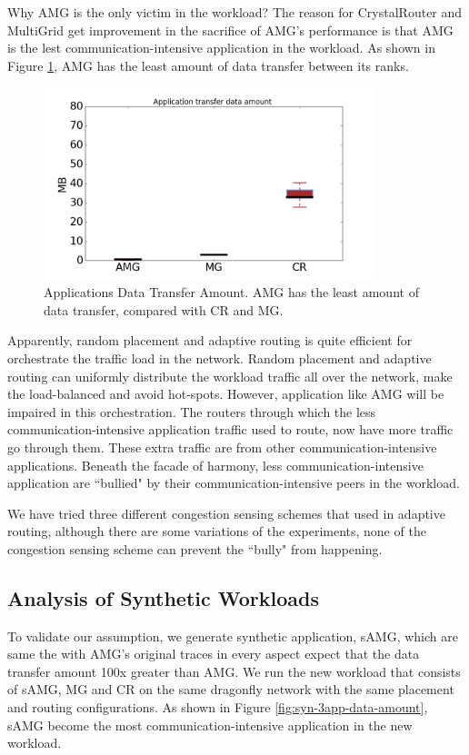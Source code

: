 \documentclass[conference,compsoc]{IEEEtran}
\begin{document}
Why AMG is the only victim in the workload? The reason for CrystalRouter and MultiGrid get improvement in the sacrifice of AMG's performance is that AMG is the lest communication-intensive application in the workload. As shown in Figure \ref{fig:3app-data-amount}, AMG has the least amount of data transfer between its ranks. 

\begin{figure}[t!]
  \centering
  \includegraphics[height=2.2in]{data_amount}
  \caption{Applications Data Transfer Amount. AMG has the least amount of data transfer, compared with CR and MG.}
  \label{fig:3app-data-amount}
\end{figure}

Apparently, random placement and adaptive routing is quite efficient for orchestrate the traffic load in the network. Random placement and adaptive routing can uniformly distribute the workload traffic all over the network, make the load-balanced and avoid hot-spots. However, application like AMG will be impaired in this orchestration. The routers through which the less communication-intensive application traffic used to route, now have more traffic go through them. These extra traffic are from other communication-intensive applications. Beneath the facade of harmony, less communication-intensive application are ``bullied" by their communication-intensive peers in the workload. 

We have tried three different congestion sensing schemes that used in adaptive routing\cite{dally-dragonfly}, although there are some variations of the experiments, none of the congestion sensing scheme can prevent the ``bully" from happening. 

\subsection{Analysis of Synthetic Workloads}

To validate our assumption, we generate synthetic application, sAMG, which are same the with AMG's original traces in every aspect expect that the data transfer amount 100x greater than AMG. We run the new workload that consists of sAMG, MG and CR on the same dragonfly network with the same placement and routing configurations. As shown in Figure \ref{fig:syn-3app-data-amount}, sAMG become the most communication-intensive application in the new workload. 
\end{document}
